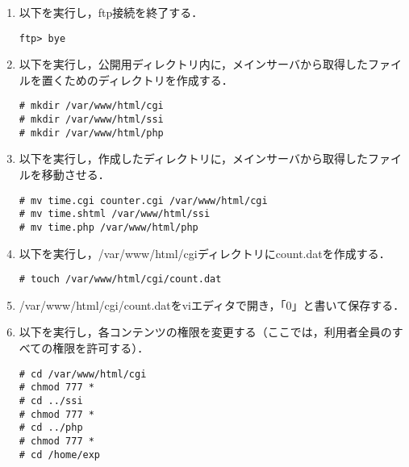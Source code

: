 \documentclass[a4j,titlepage]{jarticle}
\begin{document}
\begin{itemize}
\begin{enumerate}
\item 以下を実行し，ftp接続を終了する．
\begin{screen}
\begin{center}
\begin{verbatim}
ftp> bye
\end{verbatim}
\end{center}
\end{screen}

\item 以下を実行し，公開用ディレクトリ内に，メインサーバから取得したファイルを置くためのディレクトリを作成する．
\begin{screen}
\begin{center}
\begin{verbatim}
# mkdir /var/www/html/cgi
# mkdir /var/www/html/ssi
# mkdir /var/www/html/php
\end{verbatim}
\end{center}
\end{screen}

\item 以下を実行し，作成したディレクトリに，メインサーバから取得したファイルを移動させる．
\begin{screen}
\begin{center}
\begin{verbatim}
# mv time.cgi counter.cgi /var/www/html/cgi
# mv time.shtml /var/www/html/ssi
# mv time.php /var/www/html/php
\end{verbatim}
\end{center}
\end{screen}

\item 以下を実行し，/var/www/html/cgiディレクトリにcount.datを作成する．
\begin{screen}
\begin{center}
\begin{verbatim}
# touch /var/www/html/cgi/count.dat
\end{verbatim}
\end{center}
\end{screen}

\item /var/www/html/cgi/count.datをviエディタで開き，「0」と書いて保存する．

\item 以下を実行し，各コンテンツの権限を変更する（ここでは，利用者全員のすべての権限を許可する）．
\begin{screen}
\begin{center}
\begin{verbatim}
# cd /var/www/html/cgi
# chmod 777 *
# cd ../ssi
# chmod 777 *
# cd ../php
# chmod 777 *
# cd /home/exp
\end{verbatim}
\end{center}
\end{screen}


\end{enumerate}
\end{itemize}
\end{document}
